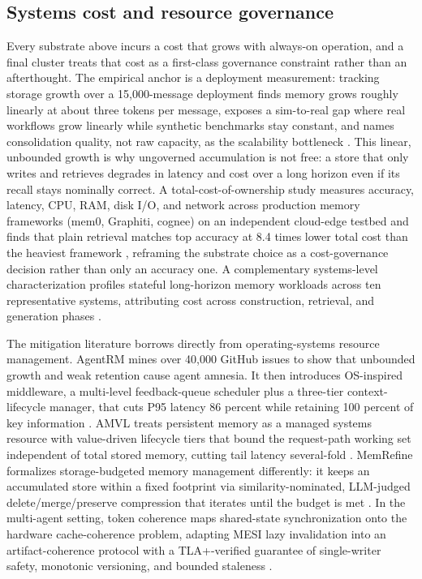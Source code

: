 \subsection{Systems cost and resource governance}

Every substrate above incurs a cost that grows with always-on operation, and a final cluster treats that cost as a first-class governance constraint rather than an afterthought. The empirical anchor is a deployment measurement: tracking storage growth over a 15,000-message deployment finds memory grows roughly linearly at about three tokens per message, exposes a sim-to-real gap where real workflows grow linearly while synthetic benchmarks stay constant, and names consolidation quality, not raw capacity, as the scalability bottleneck \citep{milosevic2026episodicsemantic}. This linear, unbounded growth is why ungoverned accumulation is not free: a store that only writes and retrieves degrades in latency and cost over a long horizon even if its recall stays nominally correct. A total-cost-of-ownership study measures accuracy, latency, CPU, RAM, disk I/O, and network across production memory frameworks (mem0, Graphiti, cognee) on an independent cloud-edge testbed and finds that plain retrieval matches top accuracy at 8.4 times lower total cost than the heaviest framework \citep{wolff2026costaccuracy}, reframing the substrate choice as a cost-governance decision rather than only an accuracy one. A complementary systems-level characterization profiles stateful long-horizon memory workloads across ten representative systems, attributing cost across construction, retrieval, and generation phases \citep{omri2026agentmemorycharacterization}.

The mitigation literature borrows directly from operating-systems resource management. AgentRM mines over 40,000 GitHub issues to show that unbounded growth and weak retention cause agent amnesia. It then introduces OS-inspired middleware, a multi-level feedback-queue scheduler plus a three-tier context-lifecycle manager, that cuts P95 latency 86 percent while retaining 100 percent of key information \citep{she2026agentrm}. AMVL treats persistent memory as a managed systems resource with value-driven lifecycle tiers that bound the request-path working set independent of total stored memory, cutting tail latency several-fold \citep{bamidele2026amvl}. MemRefine formalizes storage-budgeted memory management differently: it keeps an accumulated store within a fixed footprint via similarity-nominated, LLM-judged delete/merge/preserve compression that iterates until the budget is met \citep{kim2026memrefine}. In the multi-agent setting, token coherence maps shared-state synchronization onto the hardware cache-coherence problem, adapting MESI lazy invalidation into an artifact-coherence protocol with a TLA+-verified guarantee of single-writer safety, monotonic versioning, and bounded staleness \citep{parakhin2026tokencoherence}.

